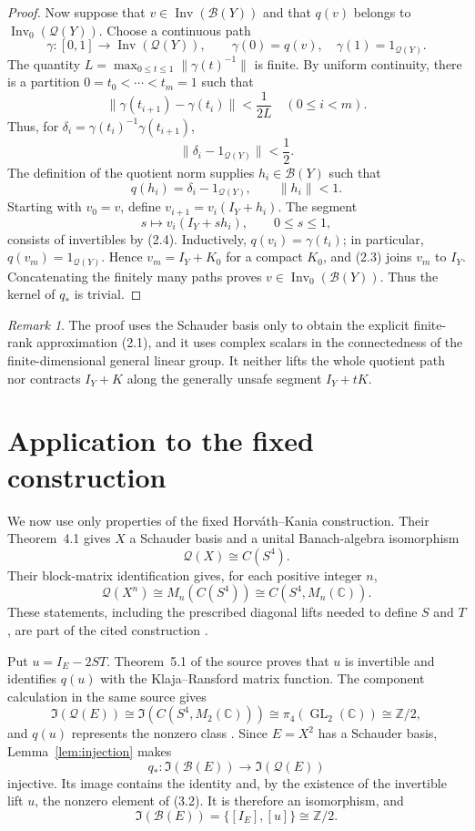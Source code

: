 \documentclass[11pt]{article}
\theoremstyle{remark}
\newtheorem{remark}[theorem]{Remark}
\newcommand{\B}{\mathcal B}
\newcommand{\Q}{\mathcal Q}
\newcommand{\Inv}{\operatorname{Inv}}
\newcommand{\Invzero}{\operatorname{Inv}_0}
\newcommand{\GL}{\operatorname{GL}}
\newcommand{\Id}{\mathfrak I}
\begin{document}
\begin{proof}
Now suppose that $v\in\Inv(\B(Y))$ and that $q(v)$ belongs to
$\Invzero(\Q(Y))$.  Choose a continuous path
\[
 \gamma:[0,1]\longrightarrow\Inv(\Q(Y)),
 \qquad \gamma(0)=q(v),\quad \gamma(1)=1_{\Q(Y)}.
\]
The quantity
\(
L=\max_{0\le t\le1}\lVert\gamma(t)^{-1}\rVert
\)
is finite.  By uniform continuity, there is a partition
$0=t_0<\cdots<t_m=1$ such that
\[
 \lVert\gamma(t_{i+1})-\gamma(t_i)\rVert<\frac{1}{2L}
 \quad(0\le i<m).
\]
Thus, for
\(
\delta_i=\gamma(t_i)^{-1}\gamma(t_{i+1})
\),
\[
 \lVert\delta_i-1_{\Q(Y)}\rVert<\frac12.
\]
The definition of the quotient norm supplies $h_i\in\B(Y)$ such that
\[
 q(h_i)=\delta_i-1_{\Q(Y)},
 \qquad \lVert h_i\rVert<1.                            \tag{2.4}
\]
Starting with $v_0=v$, define $v_{i+1}=v_i(I_Y+h_i)$.  The segment
\[
 s\longmapsto v_i(I_Y+s h_i),\qquad 0\le s\le1,
\]
consists of invertibles by (2.4).  Inductively,
$q(v_i)=\gamma(t_i)$; in particular, $q(v_m)=1_{\Q(Y)}$.  Hence
$v_m=I_Y+K_0$ for a compact $K_0$, and (2.3) joins $v_m$ to $I_Y$.
Concatenating the finitely many paths proves
$v\in\Invzero(\B(Y))$.  Thus the kernel of $q_*$ is trivial.
\end{proof}

\begin{remark}\label{rem:hypotheses}
The proof uses the Schauder basis only to obtain the explicit finite-rank
approximation (2.1), and it uses complex scalars in the connectedness of the
finite-dimensional general linear group.  It neither lifts the whole quotient
path nor contracts $I_Y+K$ along the generally unsafe segment $I_Y+tK$.
\end{remark}

\section{Application to the fixed construction}

We now use only properties of the fixed Horv\'ath--Kania construction.  Their
Theorem~4.1 gives $X$ a Schauder basis and a unital Banach-algebra isomorphism
\[
  \Q(X)\cong C(S^4).
\]
Their block-matrix identification gives, for each positive integer $n$,
\[
  \Q(X^n)\cong M_n(C(S^4))
             \cong C(S^4,M_n(\mathbb C)).              \tag{3.1}
\]
These statements, including the prescribed diagonal lifts needed to define
$S$ and $T$, are part of the cited construction
\cite[Theorem~4.1 and Lemma~4.5]{HorvathKania2026}.

Put $u=I_E-2ST$.  Theorem~5.1 of the source proves that $u$ is invertible and
identifies $q(u)$ with the Klaja--Ransford matrix function.  The component
calculation in the same source gives
\[
 \Id(\Q(E))
 \cong \Id(C(S^4,M_2(\mathbb C)))
 \cong \pi_4(\GL_2(\mathbb C))
 \cong \mathbb Z/2,                                    \tag{3.2}
\]
and $q(u)$ represents the nonzero class
\cite[Theorem~5.1 and p.~23]{HorvathKania2026}.  Since $E=X^2$ has a
Schauder basis, Lemma~\ref{lem:injection} makes
\[
 q_*:\Id(\B(E))\longrightarrow\Id(\Q(E))
\]
injective.  Its image contains the identity and, by the existence of the
invertible lift $u$, the nonzero element of (3.2).  It is therefore an
isomorphism, and
\[
 \Id(\B(E))=\{[I_E],[u]\}\cong\mathbb Z/2.             \tag{3.3}
\]
\end{document}
